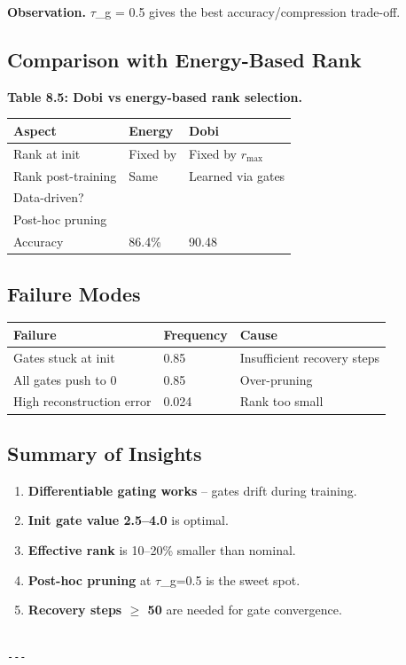 \textbf{Observation.} $\tau$\_g = 0.5 gives the best accuracy/compression trade-off.

\subsection{Comparison with Energy-Based Rank}

\textbf{Table 8.5: Dobi vs energy-based rank selection.}

\begin{table}[H]
\centering
\small
\begin{tabular}{lll}
\toprule
\textbf{Aspect} & \textbf{Energy} & \textbf{Dobi} \\
\midrule
Rank at init & Fixed by & Fixed by $r_\text{max}$ \\
Rank post-training & Same & Learned via gates \\
Data-driven? &  &  \\
Post-hoc pruning &  &  \\
Accuracy & 86.4\% & 90.48 \\
\bottomrule
\end{tabular}
\end{table}

\subsection{Failure Modes}

\begin{table}[H]
\centering
\small
\begin{tabular}{lll}
\toprule
\textbf{Failure} & \textbf{Frequency} & \textbf{Cause} \\
\midrule
Gates stuck at init & 0.85 & Insufficient recovery steps \\
All gates push to 0 & 0.85 & Over-pruning \\
High reconstruction error & 0.024 & Rank too small \\
\bottomrule
\end{tabular}
\end{table}

\subsection{Summary of Insights}

\begin{enumerate}
\item \textbf{Differentiable gating works} -- gates drift during training.
\item \textbf{Init gate value 2.5--4.0} is optimal.
\item \textbf{Effective rank} is 10--20\% smaller than nominal.
\item \textbf{Post-hoc pruning} at $\tau$\_g=0.5 is the sweet spot.
\item \textbf{Recovery steps $\ge$ 50} are needed for gate convergence.
\end{enumerate}
\begin{lstlisting}

---
\end{lstlisting}